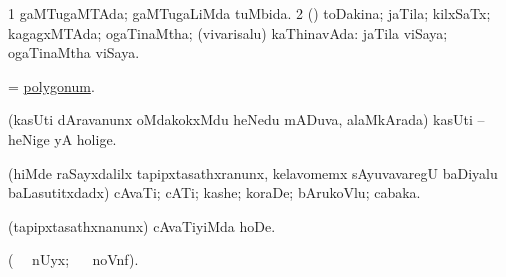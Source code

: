 \bentry
{}
\gl{\gu}
\bmng
\bnum
\num{1} gaMTugaMTAda; gaMTugaLiMda tuMbida. 
\num{2} (\rUpa) toDakina; jaTila; kilxSaTx; kagagxMTAda; ogaTinaMtha; (vivarisalu) kaThinavAda:  jaTila viSaya; ogaTinaMtha viSaya. 
\enum
\emng
\eentry

\bentry
{}
\gl{\nA}
\bmng
= \hyperref{kandict_p.pdf}{P}{polygonum}{polygonum}. 
\emng
\eentry

\bentry
{}
\gl{\nA}
\bmng
(kasUti dAravanunx oMdakokxMdu heNedu mADuva, alaMkArada) kasUti -- heNige yA holige. 
\emng
\eentry

\bentry
{}
\gl{\nA}
\bmng
(hiMde raSayxdalilx tapipxtasathxranunx, kelavomemx sAyuvavaregU baDiyalu baLasutitxdadx) cAvaTi; cATi; kashe; koraDe; bArukoVlu; cabaka. 
\emng
\eentry

\bentry
{}
\gl{\sakirx}
\bmng
(tapipxtasathxnanunx) cAvaTiyiMda hoDe. 
\emng
\eentry

\bentry
{}
\gl{\kirx}
{(\BU\  \ucAcx\ nUyx; \BUkaq\  \ucAcx\ noVnf).}

